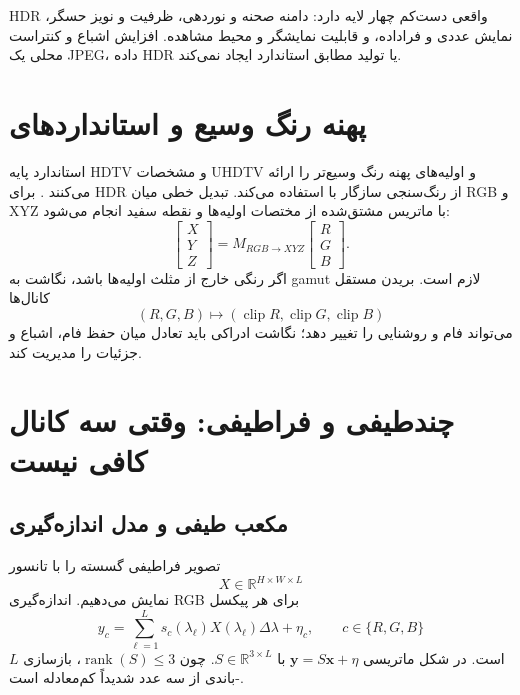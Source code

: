 \documentclass[12pt,openany,oneside]{book}
\newcommand{\R}{\mathbb{R}}
\newcommand{\Z}{\mathbb{Z}}
\newcommand{\vect}[1]{\bm{#1}}
\newcommand{\clip}{\operatorname{clip}}
\newcommand{\rank}{\operatorname{rank}}
\begin{document}
\begin{keybox}
HDR واقعی دست‌کم چهار لایه دارد: دامنه صحنه و نوردهی، ظرفیت و نویز حسگر، نمایش عددی و فراداده،
و قابلیت نمایشگر و محیط مشاهده. افزایش اشباع و کنتراست محلی یک JPEG، داده HDR یا تولید مطابق
استاندارد ایجاد نمی‌کند.
\end{keybox}

\section{پهنه رنگ وسیع و استانداردهای }

استاندارد  پایه HDTV و  مشخصات UHDTV و اولیه‌های پهنه رنگ وسیع‌تر را
ارائه می‌کنند \cite{iturbt709,iturbt2020}.  برای HDR از رنگ‌سنجی سازگار با
 استفاده می‌کند. تبدیل خطی میان RGB و XYZ با ماتریس مشتق‌شده از مختصات اولیه‌ها و
نقطه سفید انجام می‌شود:
\begin{equation}
\begin{bmatrix}X\\Y\\Z\end{bmatrix}
=M_{RGB\to XYZ}
\begin{bmatrix}R\\G\\B\end{bmatrix}.
\end{equation}
اگر رنگی خارج از مثلث اولیه‌ها باشد، نگاشت به gamut لازم است. بریدن مستقل کانال‌ها
\begin{equation}
(R,G,B)\mapsto(\clip R,\clip G,\clip B)
\end{equation}
می‌تواند فام و روشنایی را تغییر دهد؛ نگاشت ادراکی باید تعادل میان حفظ فام، اشباع و جزئیات را
مدیریت کند.

\section{چندطیفی و فراطیفی: وقتی سه کانال کافی نیست}

\subsection{مکعب طیفی و مدل اندازه‌گیری}

تصویر فراطیفی گسسته را با تانسور
\begin{equation}
X\in\R^{H\times W\times L}
\end{equation}
نمایش می‌دهیم. اندازه‌گیری RGB برای هر پیکسل
\begin{equation}
y_c=\sum_{\ell=1}^{L}s_c(\lambda_\ell)
X(\lambda_\ell)\Delta\lambda+\eta_c,
\qquad c\in\{R,G,B\}
\end{equation}
است. در شکل ماتریسی \(\vect y=S\vect x+\eta\) با \(S\in\R^{3\times L}\). چون
\(\rank(S)\le3\)، بازسازی \(L\)-باندی از سه عدد شدیداً کم‌معادله است.
\end{document}
